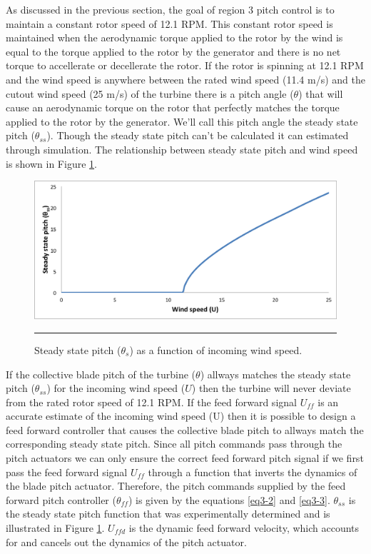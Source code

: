 As discussed in the previous section, the goal of region 3 pitch control is to maintain a constant rotor speed of 12.1 RPM. This constant rotor speed is maintained when the aerodynamic torque applied to the rotor by the wind is equal to the torque applied to the rotor by the generator and there is no net torque to accellerate or decellerate the rotor. If the rotor is spinning at 12.1 RPM and the wind speed is anywhere between the rated wind speed (11.4 m/s) and the cutout wind speed (25 m/s) of the turbine there is a pitch angle ($\theta$) that will cause an aerodynamic torque on the rotor that perfectly matches the torque applied to the rotor by the generator. We'll call this pitch angle the steady state pitch ($\theta_{ss}$). Though the steady state pitch can't be calculated it can estimated through simulation. The relationship between steady state pitch and wind speed is shown in Figure \ref{fig3-11}.

 \begin{figure}[htbp]
	\centering
		\includegraphics[width=\linewidth]{Figures/ch3Figures/fig3-11.png}
		\rule{35em}{0.5pt}
	\caption{Steady state pitch ($\theta_{s}$) as a function of incoming wind speed.}
	\label{fig3-11}
\end{figure}

If the collective blade pitch of the turbine ($\theta$) allways matches the steady state pitch ($\theta_{ss}$) for the incoming wind speed ($U$) then the turbine will never deviate from the rated rotor speed of 12.1 RPM. If the feed forward signal $U_{ff}$ is an accurate estimate of the incoming wind speed (U) then it is possible to design a feed forward controller that causes the collective blade pitch to allways match the corresponding steady state pitch. Since all pitch commands pass through the pitch actuators we can only ensure the correct feed forward pitch signal if we first pass the feed forward signal $U_{ff}$ through a function that inverts the dynamics of the blade pitch actuator. Therefore, the pitch commands supplied by the feed forward pitch controller ($\theta_{ff}$) is given by the equations \ref{eq3-2} and \ref{eq3-3}. $\theta_{ss}$ is the steady state pitch function that was experimentally determined and is illustrated in Figure \ref{fig3-11}. $U_{ffd}$ is the dynamic feed forward velocity, which accounts for and cancels out the dynamics of the pitch actuator.

